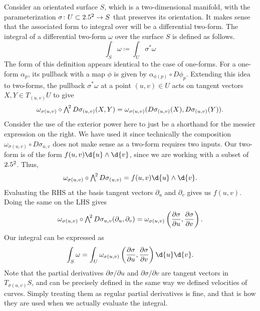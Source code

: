 \documentclass[a4paper,12pt]{article}
\begin{document}
Consider an orientated surface $S$, which is a two-dimensional manifold, with the parameterization $\sigma \colon U \subset 2.5^2 \to S$ that preserves its orientation.
It makes sense that the associated form to integral over will be a differential two-form.
The integral of a differential two-form $\omega$ over the surface $S$ is defined as follows.
\begin{equation*}
    \int_S \omega \coloneq \int_U \sigma^*\omega
\end{equation*}
The form of this definition appears identical to the case of one-forms.
For a one-form $\alpha_p$, its pullback with a map $\phi$ is given by $\alpha_{\phi(p)} \circ D\phi_p$.
Extending this idea to two-forms, the pullback $\sigma^*\omega$ at a point $(u, v) \in U$ acts on tangent vectors $X, Y \in T_{(u,v)} U$ to give
\begin{equation*}
    \omega_{\sigma(u, v)} \circ \extp^2 D\sigma_{(u,v)}(X,Y) = \omega_{\sigma(u, v)}(D\sigma_{(u,v)}(X), D\sigma_{(u,v)}(Y)).
\end{equation*}
Consider the use of the exterior power here to just be a shorthand for the messier expression on the right.
We have used it since technically the composition $\omega_{\sigma(u, v)} \circ D\sigma_{u,v}$ does not make sense as a two-form requires two inputs.
Our two-form is of the form $f(u, v) \d{u} \wedge \d{v}$, since we are working with a subset of $2.5^2$.
Thus,
\begin{equation*}
    \omega_{\sigma(u, v)} \circ \extp^2 D\sigma_{(u,v)} = f(u, v) \d{u} \wedge \d{v}.
\end{equation*}
Evaluating the RHS at the basis tangent vectors $\partial_u$ and $\partial_v$ gives us $f(u, v)$.
Doing the same on the LHS gives
\begin{equation*}
    \omega_{\sigma(u, v)} \circ \extp^2 D\sigma_{u,v} (\partial_u, \partial_v) = \omega_{\sigma(u, v)}\left(\frac{\partial \sigma}{\partial u}, \frac{\partial \sigma}{\partial v}\right).
\end{equation*}
Our integral can be expressed as
\begin{equation*}
    \int_S \omega = \int_U \omega_{\sigma(u, v)}\left(\frac{\partial \sigma}{\partial u}, \frac{\partial \sigma}{\partial v}\right) \d{u} \d{v}.
\end{equation*}
Note that the partial derivatives $\partial \sigma/\partial u$ and $\partial \sigma/\partial v$ are tangent vectors in $T_{\sigma(u, v)} S$, and can be precisely defined in the same way we defined velocities of curves.
Simply treating them as regular partial derivatives is fine, and that is how they are used when we actually evaluate the integral.
\end{document}
